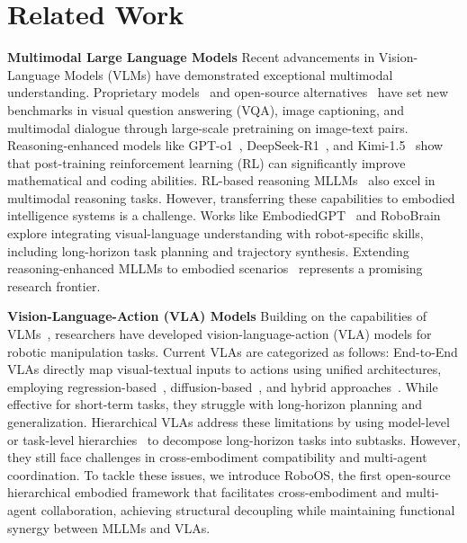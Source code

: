 \section{Related Work}
\label{sec:related}
\textbf{Multimodal Large Language Models}  
Recent advancements in Vision-Language Models (VLMs) have demonstrated exceptional multimodal understanding. Proprietary models~\cite{hurst2024gpt4o, anthropic2024claude3.5, wuevaluating, Google2023gemini} and open-source alternatives~\cite{Qwen2.5-VL, chen2024internvl, li2024llavaov, abdin2024phi, beyer2024paligemma} have set new benchmarks in visual question answering (VQA), image captioning, and multimodal dialogue through large-scale pretraining on image-text pairs. 
Reasoning-enhanced models like GPT-o1~\cite{OpenAI2024o1}, DeepSeek-R1~\cite{guo2025deepseek}, and Kimi-1.5~\cite{team2025kimi} show that post-training reinforcement learning (RL) can significantly improve mathematical and coding abilities. RL-based reasoning MLLMs~\cite{tan2025reason, huang2025vision} also excel in multimodal reasoning tasks. 
However, transferring these capabilities to embodied intelligence systems is a challenge. Works like EmbodiedGPT~\cite{mu2023embodiedgpt} and RoboBrain~\cite{ji2025robobrain} explore integrating visual-language understanding with robot-specific skills, including long-horizon task planning and trajectory synthesis. Extending reasoning-enhanced MLLMs to embodied scenarios~\cite{tan2025reason,  zhang2025embodied} represents a promising research frontier.


\textbf{Vision-Language-Action (VLA) Models}  
Building on the capabilities of VLMs~\cite{ chen2024internvl, li2024llavaov, beyer2024paligemma, li2024foundation}, researchers have developed vision-language-action (VLA) models for robotic manipulation tasks. Current VLAs are categorized as follows:
End-to-End VLAs directly map visual-textual inputs to actions using unified architectures, employing regression-based~\cite{li2023vision, brohan2023rt, kim2024openvla, hao2025tla, liu2024robomamba}, diffusion-based~\cite{liu2024rdt, black2024pi_0, team2024octo}, and hybrid approaches~\cite{liu2025hybridvla}. While effective for short-term tasks, they struggle with long-horizon planning and generalization.
Hierarchical VLAs address these limitations by using model-level~\cite{liu2024self, Helix2024, team2025gemini_robo, bjorck2025gr00t} or task-level hierarchies~\cite{shi2025hi, pi05} to decompose long-horizon tasks into subtasks. However, they still face challenges in cross-embodiment compatibility and multi-agent coordination.
To tackle these issues, we introduce RoboOS, the first open-source hierarchical embodied framework that facilitates cross-embodiment and multi-agent collaboration, achieving structural decoupling while maintaining functional synergy between MLLMs and VLAs.

